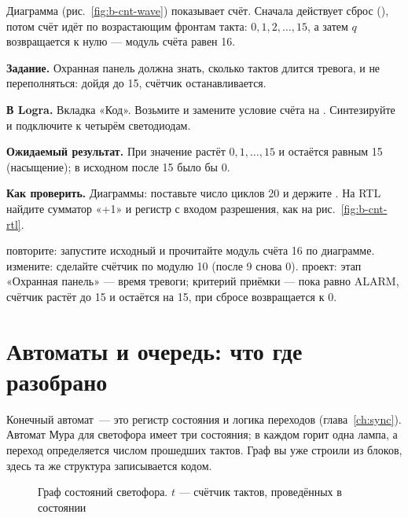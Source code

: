 Диаграмма (рис.~\ref{fig:b-cnt-wave}) показывает счёт. Сначала действует
сброс (), потом счёт идёт по возрастающим фронтам такта: $0, 1,
2, \ldots, 15$, а затем $q$ возвращается к нулю --- модуль счёта равен 16.


\begin{diybox}
\textbf{Задание.} Охранная панель должна знать, сколько тактов длится тревога, и не переполняться: дойдя до 15, счётчик останавливается.

\textbf{В Logra.} Вкладка «Код». Возьмите  и замените условие счёта на . Синтезируйте и подключите  к четырём светодиодам.

\textbf{Ожидаемый результат.} При  значение растёт $0,1,\dots,15$ и остаётся равным 15 (насыщение); в исходном  после 15 было бы 0.

\textbf{Как проверить.} Диаграммы: поставьте число циклов 20 и держите . На RTL найдите сумматор «+1» и регистр с входом разрешения, как на рис.~\ref{fig:b-cnt-rtl}.

 повторите: запустите исходный  и прочитайте модуль счёта 16 по диаграмме.  измените: сделайте счётчик по модулю 10 (после 9 снова 0).  проект: этап «Охранная панель» --- время тревоги; критерий приёмки --- пока  равно ALARM, счётчик растёт до 15 и остаётся на 15, при сбросе возвращается к 0.
\end{diybox}

\section{Автоматы и очередь: что где разобрано}
\label{sec:b-fsm-ref}

Конечный автомат~--- это регистр состояния и логика переходов
(глава~\ref{ch:sync}). Автомат Мура для светофора имеет три состояния; в каждом
горит одна лампа, а переход определяется числом прошедших тактов. Граф вы уже
строили из блоков, здесь та же структура записывается кодом.

\begin{figure}[H]
\centering
{}
\caption{Граф состояний светофора. $t$ --- счётчик тактов, проведённых в состоянии}
\label{fig:b-fsm-graph}
\end{figure}

